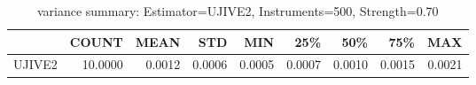 \begin{table}[ht]
\centering
\caption{variance summary: Estimator=UJIVE2, Instruments=500, Strength=0.70}
\begin{tabular}{lrrrrrrrr}
\toprule
 & COUNT & MEAN & STD & MIN & 25\% & 50\% & 75\% & MAX \\
\midrule
UJIVE2 & 10.0000 & 0.0012 & 0.0006 & 0.0005 & 0.0007 & 0.0010 & 0.0015 & 0.0021 \\
\bottomrule
\end{tabular}
\end{table}
